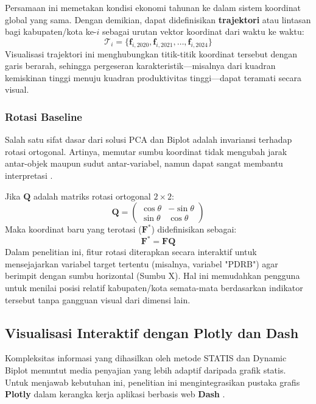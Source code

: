 \documentclass[a4paper]{article}
\theoremstyle{definition} %
\begin{document}
Persamaan ini memetakan kondisi ekonomi tahunan ke dalam sistem koordinat global yang sama. Dengan demikian, dapat didefinisikan \textbf{trajektori} atau lintasan bagi kabupaten/kota ke-$i$ sebagai urutan vektor koordinat dari waktu ke waktu:
\begin{equation}
	\mathcal{T}_i = \{ \mathbf{f}_{i,2020}, \mathbf{f}_{i,2021}, \dots, \mathbf{f}_{i,2024} \}
\end{equation}
Visualisasi trajektori ini menghubungkan titik-titik koordinat tersebut dengan garis berarah, sehingga pergeseran karakteristik—misalnya dari kuadran kemiskinan tinggi menuju kuadran produktivitas tinggi—dapat teramati secara visual.

\subsubsection{Rotasi Baseline}

Salah satu sifat dasar dari solusi PCA dan Biplot adalah invariansi terhadap rotasi ortogonal. Artinya, memutar sumbu koordinat tidak mengubah jarak antar-objek maupun sudut antar-variabel, namun dapat sangat membantu interpretasi \citet{kroonenberg2008}.

Jika $\mathbf{Q}$ adalah matriks rotasi ortogonal $2 \times 2$:
\begin{equation}
    \mathbf{Q} = \begin{pmatrix} \cos \theta & -\sin \theta \\ \sin \theta & \cos \theta \end{pmatrix}
\end{equation}
Maka koordinat baru yang terotasi ($\mathbf{F}^*$) didefinisikan sebagai:
\begin{equation}
    \mathbf{F}^* = \mathbf{F} \mathbf{Q}
\end{equation}
Dalam penelitian ini, fitur rotasi diterapkan secara interaktif untuk mensejajarkan variabel target tertentu (misalnya, variabel "PDRB") agar berimpit dengan sumbu horizontal (Sumbu X). Hal ini memudahkan pengguna untuk menilai posisi relatif kabupaten/kota semata-mata berdasarkan indikator tersebut tanpa gangguan visual dari dimensi lain.

\subsection{Visualisasi Interaktif dengan Plotly dan Dash}

Kompleksitas informasi yang dihasilkan oleh metode STATIS dan Dynamic Biplot menuntut media penyajian yang lebih adaptif daripada grafik statis. Untuk menjawab kebutuhan ini, penelitian ini mengintegrasikan pustaka grafis \textbf{Plotly} \citet{plotly2015} dalam kerangka kerja aplikasi berbasis web \textbf{Dash} \citet{dash_docs}.
\end{document}
